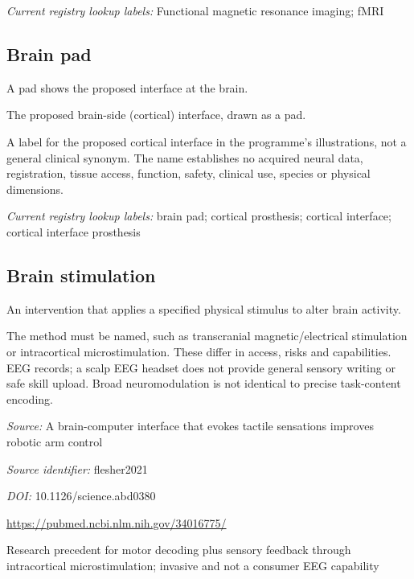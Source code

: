 \noindent\textit{Current registry lookup labels:} Functional magnetic resonance imaging; fMRI\par

\subsection*{Brain pad}
\noindent A pad shows the proposed interface at the brain.\par
\noindent The proposed brain-side (cortical) interface, drawn as a pad.\par
\noindent A label for the proposed cortical interface in the programme's illustrations, not a general clinical synonym. The name establishes no acquired neural data, registration, tissue access, function, safety, clinical use, species or physical dimensions.\par

\noindent\textit{Current registry lookup labels:} brain pad; cortical prosthesis; cortical interface; cortical interface prosthesis\par

\begin{samepage}
\subsection*{Brain stimulation}
\noindent An intervention that applies a specified physical stimulus to alter brain activity.\par
\end{samepage}
\noindent The method must be named, such as transcranial magnetic/electrical stimulation or intracortical microstimulation. These differ in access, risks and capabilities. EEG records; a scalp EEG headset does not provide general sensory writing or safe skill upload. Broad neuromodulation is not identical to precise task-content encoding.\par



\noindent\textit{Source:} A brain-computer interface that evokes tactile sensations improves robotic arm control\par
\noindent\textit{Source identifier:} flesher2021\par
\noindent\textit{DOI:} 10.1126/science.abd0380\par
\noindent\url{https://pubmed.ncbi.nlm.nih.gov/34016775/}\par
\noindent Research precedent for motor decoding plus sensory feedback through intracortical microstimulation; invasive and not a consumer EEG capability\par


